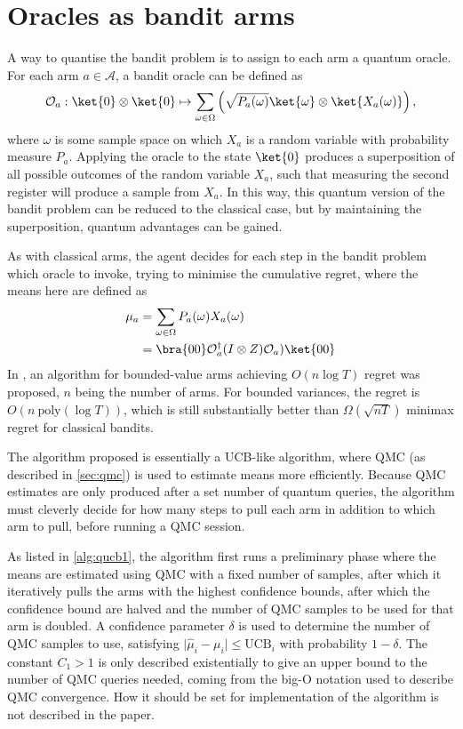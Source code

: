 \section{Oracles as bandit arms}
A way to quantise the bandit problem is to assign to each arm a quantum oracle.
For each arm $a \in \mathcal{A}$, a bandit oracle can be defined as
\begin{equation}
    \mathcal{O}_a: \ket{0}\otimes\ket{0} \mapsto \sum_{\omega \in \Omega} \left(\sqrt{P_a(\omega)} \ket{\omega} \otimes \ket{X_a(\omega)} \right),
    \label{eq:wan_oracle}
\end{equation}
where $\omega$ is some sample space on which $X_a$ is a random variable with probability measure $P_a$.
Applying the oracle to the state $\ket{0}$ produces a superposition of all possible outcomes of the random variable $X_a$, such that measuring the second register will produce a sample from $X_a$.
In this way, this quantum version of the bandit problem can be reduced to the classical case, but by maintaining the superposition, quantum advantages can be gained.

As with classical arms, the agent decides for each step in the bandit problem which oracle to invoke, trying to minimise the cumulative regret, where the means here are defined as
\begin{equation}
    \begin{aligned}
        \mu_a
         & = \sum_{\omega \in \Omega} P_a(\omega) X_a(\omega)                     \\
         & = \bra{00} \mathcal{O}_a^\dagger (I \otimes Z) \mathcal{O}_a) \ket{00} \\
    \end{aligned}
\end{equation}
In \autocite{wan2022}, an algorithm for bounded-value arms achieving $O(n \log T)$ regret was proposed, $n$ being the number of arms.
For bounded variances, the regret is $O(n \ \text{poly}(\log T))$, which is still substantially better than $\Omega(\sqrt{nT})$ minimax regret for classical bandits.

The algorithm proposed is essentially a UCB-like algorithm, where QMC (as described in \cref{sec:qmc}) is used to estimate means more efficiently.
Because QMC estimates are only produced after a set number of quantum queries, the algorithm must cleverly decide for how many steps to pull each arm in addition to which arm to pull, before running a QMC session.

As listed in \cref{alg:qucb1}, the algorithm first runs a preliminary phase where the means are estimated using QMC with a fixed number of samples, after which it iteratively pulls the arms with the highest confidence bounds, after which the confidence bound are halved and the number of QMC samples to be used for that arm is doubled.
A confidence parameter $\delta$ is used to determine the number of QMC samples to use, satisfying $\lvert\hat{\mu}_i - \mu_i\rvert \leq \text{UCB}_i$ with probability $1-\delta$.
The constant $C_1>1$ is only described existentially to give an upper bound to the number of QMC queries needed, coming from the big-O notation used to describe QMC convergence.
How it should be set for implementation of the algorithm is not described in the paper.

